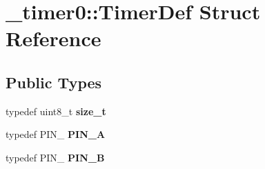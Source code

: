 \hypertarget{struct__timer0_1_1TimerDef}{}\section{\+\_\+timer0\+:\+:Timer\+Def Struct Reference}
\label{struct__timer0_1_1TimerDef}
\subsection*{Public Types}
\begin{DoxyCompactItemize}
\item 
\hypertarget{struct__timer0_1_1TimerDef_ac97e10949ae7dd8703568e7accb4346c}{}\label{struct__timer0_1_1TimerDef_ac97e10949ae7dd8703568e7accb4346c} 
typedef uint8\+\_\+t {\bfseries size\+\_\+t}
\item 
\hypertarget{struct__timer0_1_1TimerDef_ab4f68d388e3b8fdd3e07032692c793a4}{}\label{struct__timer0_1_1TimerDef_ab4f68d388e3b8fdd3e07032692c793a4} 
typedef P\+I\+N\+\_ {\bfseries P\+I\+N\+\_\+A}
\item 
\hypertarget{struct__timer0_1_1TimerDef_acb1e52236e26a885f377ab78b88cfc9c}{}\label{struct__timer0_1_1TimerDef_acb1e52236e26a885f377ab78b88cfc9c} 
typedef P\+I\+N\+\_ {\bfseries P\+I\+N\+\_\+B}
\end{DoxyCompactItemize}
